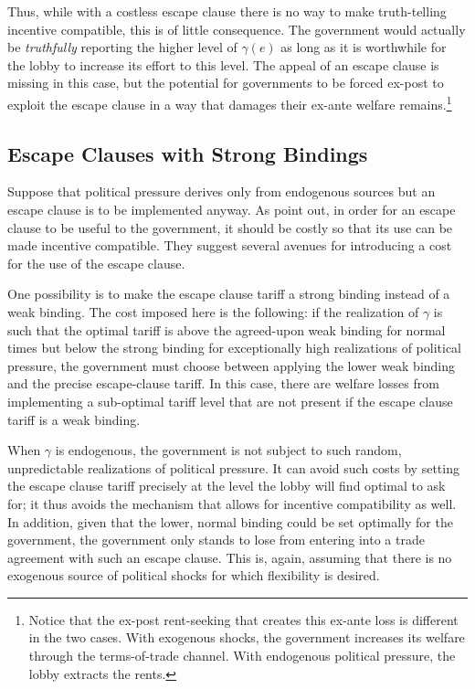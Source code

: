 \documentclass[12pt]{article}
\newcommand{\ga}{\gamma}
\begin{document}
Thus, while with a costless escape clause there is no way to make truth-telling incentive compatible, this is of little consequence. The government would actually be \textit{truthfully} reporting the higher level of $\ga(e)$ as long as it is worthwhile for the lobby to increase its effort to this level. The appeal of an escape clause is missing in this case, but the potential for governments to be forced ex-post to exploit the escape clause in a way that damages their ex-ante welfare remains.\footnote{Notice that the ex-post rent-seeking that creates this ex-ante loss is different in the two cases. With exogenous shocks, the government increases its welfare through the terms-of-trade channel. With endogenous political pressure, the lobby extracts the rents.}

\subsection{Escape Clauses with Strong Bindings}
Suppose that political pressure derives only from endogenous sources but an escape clause is to be implemented anyway. As \Textcite{bs2005} point out, in order for an escape clause to be useful to the government, it should be costly so that its use can be made incentive compatible. They suggest several avenues for introducing a cost for the use of the escape clause.

One possibility is to make the escape clause tariff a strong binding instead of a weak binding. The cost imposed here is the following: if the realization of $\ga$ is such that the optimal tariff is above the agreed-upon weak binding for normal times but below the strong binding for exceptionally high realizations of political pressure, the government must choose between applying the lower weak binding and the precise escape-clause tariff. In this case, there are welfare losses from implementing a sub-optimal tariff level that are not present if the escape clause tariff is a weak binding.

When $\ga$ is endogenous, the government is not subject to such random, unpredictable realizations of political pressure. It can avoid such costs by setting the escape clause tariff precisely at the level the lobby will find optimal to ask for; it thus avoids the mechanism that allows for incentive compatibility as well. In addition, given that the lower, normal binding could be set optimally for the government, the government only stands to lose from entering into a trade agreement with such an escape clause. This is, again, assuming that there is no exogenous source of political shocks for which flexibility is desired.
\end{document}
